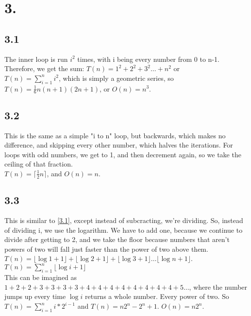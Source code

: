 \documentclass[12pt]{article}
\begin{document}
\section*{3.}
\subsection*{3.1}
The inner loop is run \(i^2\) times, with i being every number from 0 to n-1. Therefore, we get the sum:
\(T(n)=1^2+2^2+3^2\dots+n^2\) or\\
\(T(n)=\displaystyle\sum_{i=1}^n i^2\), which is simply a geometric series, so \(T(n)=\frac{1}{6}n(n+1)(2n+1)\), or \(O(n)=n^3\).
\subsection*{3.2}
This is the same as a simple "i to n" loop, but backwards, which makes no difference, and skipping every other number, which halves the iterations. For loops with odd numbers, we get to 1, and then decrement again, so we take the ceiling of that fraction.\\
\(T(n)=\lceil\frac{1}{2}n\rceil\), and \(O(n)=n\).\\
\subsection*{3.3}
This is similar to \ref{3.1}, except instead of subcracting, we're dividing. So, instead of dividing i, we use the logarithm. We have to add one, because we continue to divide after getting to 2, and we take the floor because numbers that aren't powers of two will fall just faster than the power of two above them.\\
\(T(n)=\lfloor\log 1+1\rfloor+\lfloor\log 2+1\rfloor+\lfloor\log 3+1\rfloor\dots\lfloor\log n+1\rfloor\).\\
\(T(n)=\displaystyle\sum_{i=1}^n \lfloor\log i+1\rfloor\)\\
This can be imagined as \(1+2+2+3+3+3+3+4+4+4+4+4+4+4+4+5\dots\), where the number jumps up every time \(\log i\) returns a whole number. Every power of two. So \(T(n)=\displaystyle\sum_{i=1}^n i*2^{i-1}\) and \(T(n)=n2^n-2^n+1\). \(O(n)=n2^n\).\\
\end{document}

